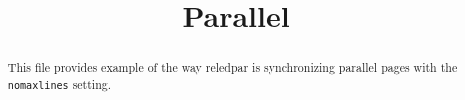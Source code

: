 \documentclass{article}
\begin{document}
\date{}
\title{Parallel}
\maketitle

\begin{abstract}
This file provides example of the way reledpar is synchronizing parallel pages with the \verb+nomaxlines+ setting.
\end{abstract}


\begin{pages}
    \begin{Leftside}
        \beginnumbering
           \autopar
           \Blindtext[20][2]
        \endnumbering
    \end{Leftside}
    \begin{Rightside}
        \beginnumbering
            \autopar
           \Blindtext[20][3]
        \endnumbering
    \end{Rightside}

\end{pages} 
\Pages
\end{document}
